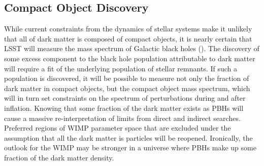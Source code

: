 \documentclass[modern,linenumbers]{aastex62}
\begin{document}
\subsection{Compact Object Discovery}

While current constraints from the dynamics of stellar systems make it unlikely that all of dark matter is composed of compact objects, it is nearly certain that LSST will measure the mass spectrum of Galactic black holes ().
The discovery of some excess component to the black hole population attributable to dark matter will require a fit of the underlying population of stellar remnants.
If such a population is discovered, it will be possible to measure not only the fraction of dark matter in compact objects, but the compact object mass spectrum, which will in turn set constraints on the spectrum of perturbations during and after inflation.
Knowing that some fraction of the dark matter exists as PBHs will cause a massive re-interpretation of limits from direct and indirect searches.
Preferred regions of WIMP parameter space that are excluded under the assumption that all the dark matter is particles will be reopened.
Ironically, the outlook for the WIMP may be stronger in a universe where PBHs make up some fraction of the dark matter density.
\end{document}
